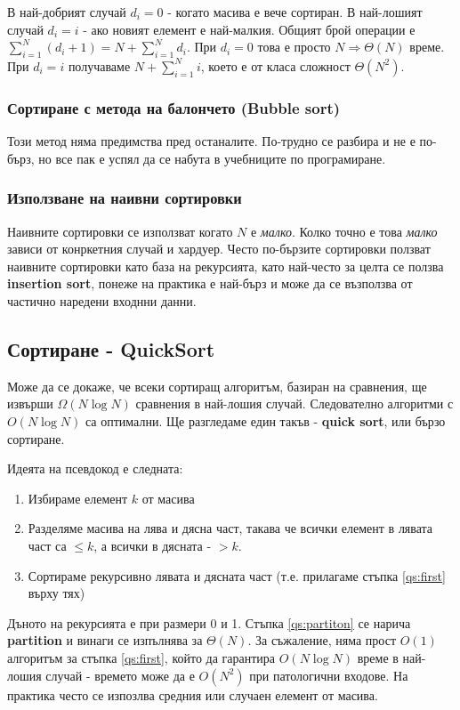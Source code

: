 \documentclass[fleqn,12pt]{article}
\begin{document}
В най-добрият случай $d_i = 0$ - когато масива е вече сортиран. В най-лошият случай $d_i = i$ - ако новият елемент е най-малкия.
Общият брой операции е $\sum_{i = 1}^{N} (d_i + 1) = N + \sum_{i = 1}^{N} d_i$.
При $d_i = 0$ това е просто $N \Rightarrow \Theta(N)$ време. При $d_i = i$ 
получаваме $N + \sum_{i = 1}^N i$, което е от класа сложност $\Theta(N^2)$.

\subsubsection{Сортиране с метода на балончето (Bubble sort)}
Този метод няма предимства пред останалите. По-трудно се разбира и не е по-бърз, но все пак е успял 
да се набута в учебниците по програмиране.

\subsubsection{Използване на наивни сортировки}
Наивните сортировки се използват когато $N$ е \textit{малко}. Колко точно е това \textit{малко} зависи от конркетния случай и хардуер.
Често по-бързите сортировки ползват наивните сортировки като база на рекурсията, като най-често за целта се ползва \textbf{insertion sort}, 
понеже на практика е най-бърз и може да се възползва от частично наредени входнни данни.

\subsection{Сортиране - QuickSort}
Може да се докаже, че всеки сортиращ алгоритъм, базиран на сравнения, ще извърши $\Omega(N \log N)$ сравнения в най-лошия случай.
Следователно алгоритми с $O(N \log N)$ са оптимални. Ще разгледаме един такъв - \textbf{quick sort}, или бързо сортиране.

Идеята на псевдокод е следната:
\begin{enumerate}
    \item \label{qs:first} Избираме елемент $k$ от масива
    \item \label{qs:partiton} Разделяме масива на лява и дясна част, такава че всички елемент в лявата част са $\leq k$, а всички в дясната - $> k$.
    \item Сортираме рекурсивно лявата и дясната част (т.е. прилагаме стъпка \ref{qs:first} върху тях)
\end{enumerate}

Дъното на рекурсията е при размери 0 и 1. Стъпка \ref{qs:partiton} се нарича \textbf{partition} и винаги се изпълнява за $\Theta(N)$.
За съжаление, няма прост $O(1)$ алгоритъм за стъпка \ref{qs:first}, който да гарантира $O(N \log N)$ време в най-лошия случай - времето може да е $O(N^2)$
при патологични входове. На практика често се изпозлва средния или случаен елемент от масива.
\end{document}
